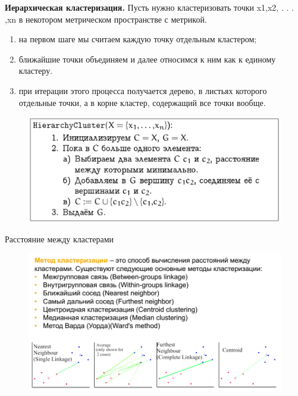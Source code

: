 \documentclass{beamer}
\begin{document}
\begin{frame}
\textbf{Иерархическая кластеризация.} Пусть нужно кластеризовать точки x1,x2, . . . ,xn в некотором метрическом пространстве с метрикой.
\begin{enumerate}
\item на первом шаге мы считаем каждую точку отдельным кластером;
\item ближайшие точки объединяем и далее относимся к ним как к единому кластеру.
\item при итерации этого процесса получается дерево, в листьях которого  отдельные точки, а в корне  кластер, содержащий все точки вообще.
\end{enumerate}
\begin{figure}[h]
\centering
\includegraphics[scale=0.4]{images/lec07-pic16.png}
\end{figure}
\end{frame}

\begin{frame}{Расстояние между кластерами}
\begin{figure}[h]
\centering
\includegraphics[scale=0.4]{images/lec07-pic17.png}
\end{figure}
\end{frame}
\end{document}
